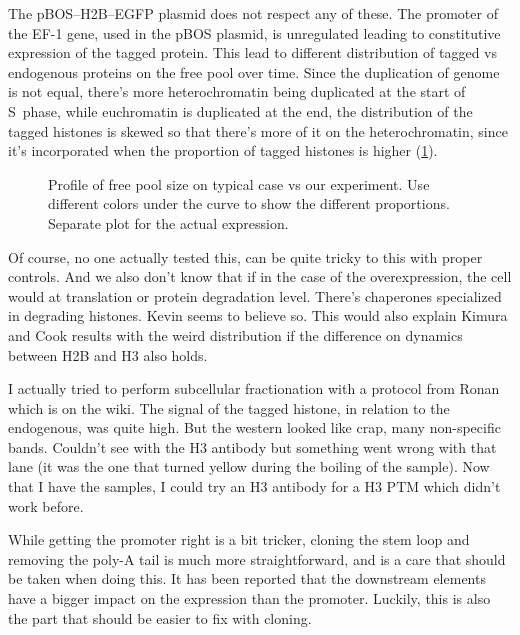   The pBOS--H2B--EGFP plasmid does not respect any of these. The promoter of the EF-1 \textalpha gene, used in the
  pBOS plasmid, is unregulated leading to constitutive expression of the tagged protein. This lead to different
  distribution of tagged vs endogenous proteins on the free pool over time. Since the duplication
  of genome is not equal, there's more heterochromatin being duplicated at the start of S~phase, while
  euchromatin is duplicated at the end, the distribution of the tagged histones is skewed so that there's
  more of it on the heterochromatin, since it's incorporated when the proportion of tagged histones is
  higher (\ref{fig:mess-histone-expression}).
  
  \begin{figure}
    \centering
                 {Profile of free pool size on typical case vs our experiment. Use
                  different colors under the curve to show the different proportions.
                  Separate plot for the actual expression}.
    \label{fig:mess-histone-expression}
  \end{figure}
  
  Of course, no one actually tested this, can be quite tricky to this with proper controls. And we also
  don't know that if in the case of the overexpression, the cell would at translation or protein degradation
  level. There's chaperones specialized in degrading histones. Kevin seems to believe so. This would
  also explain Kimura and Cook results with the weird distribution if the difference on dynamics
  between H2B and H3 also holds.
  
  I actually tried to perform subcellular fractionation with a protocol from Ronan which is on the wiki.
  The signal of the tagged histone, in relation to the endogenous, was quite high. But the western
  looked like crap, many non-specific bands. Couldn't see with the H3 antibody but something went
  wrong with that lane (it was the one that turned yellow during the boiling of the sample). Now that
  I have the samples, I could try an H3 antibody for a H3 PTM which didn't work before.
  
  While getting the promoter right is a bit tricker, cloning the stem loop and removing the poly-A tail
  is much more straightforward, and is a care that should be taken when doing this. It has been reported
  that the downstream elements have a bigger impact on the expression than the promoter. Luckily, this
  is also the part that should be easier to fix with cloning.
  
